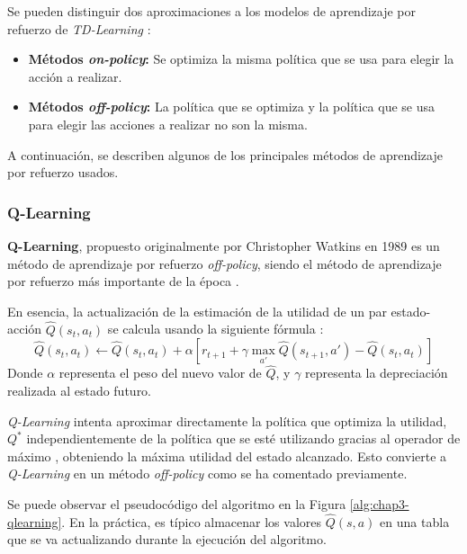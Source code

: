 Se pueden distinguir dos aproximaciones a los modelos de aprendizaje por refuerzo de \textit{TD-Learning} \cite{Sutton1998}:

\begin{itemize}
\item \textbf{Métodos \textit{on-policy}:} Se optimiza la misma política que se usa para elegir la acción a realizar.
\item \textbf{Métodos \textit{off-policy}:} La política que se optimiza y la política que se usa para elegir las acciones a realizar no son la misma.
\end{itemize}

A continuación, se describen algunos de los principales métodos de aprendizaje por refuerzo usados.


\subsubsection{Q-Learning}

\textbf{Q-Learning}, propuesto originalmente por Christopher Watkins en 1989 \cite{qlearning} es un método de aprendizaje por refuerzo \textit{off-policy}, siendo el método de aprendizaje por refuerzo más importante de la época \cite{Sutton1998}.

En esencia, la actualización de la estimación de la utilidad de un par estado-acción $\hat{Q}(s_t,a_t)$ se calcula usando la siguiente fórmula \cite{Sutton1998}:
\[\hat{Q}(s_t,a_t) \leftarrow \hat{Q}(s_t,a_t) + \alpha [r_{t+1} + \gamma \max_{a'} \hat{Q}(s_{t+1},a') - \hat{Q}(s_t,a_t)]\]
Donde $\alpha$ representa el peso del nuevo valor de $\hat{Q}$, y $\gamma$ representa la depreciación realizada al estado futuro.

\textit{Q-Learning} intenta aproximar directamente la política que optimiza la utilidad, $Q^*$ independientemente de la política que se esté utilizando gracias al operador de máximo \cite{Sutton1998}, obteniendo la máxima utilidad del estado alcanzado. Esto convierte a \textit{Q-Learning} en un método \textit{off-policy} como se ha comentado previamente.

Se puede observar el pseudocódigo del algoritmo en la Figura \ref{alg:chap3-qlearning}. En la práctica, es típico almacenar los valores $\hat{Q}(s,a)$ en una tabla que se va actualizando durante la ejecución del algoritmo.


